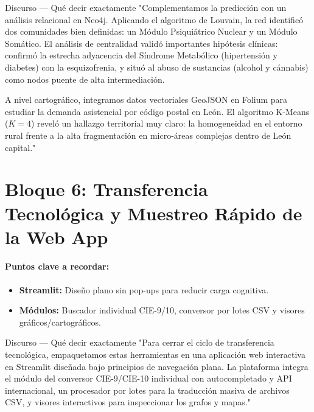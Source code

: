 \documentclass[11pt, a4paper]{article}
\newcommand{\timebadge}[2]{%
  \tcbox[
    on line,
    colback=timeBadge,
    colframe=speechBorder,
    arc=2mm,
    boxrule=0.5pt,
    top=1mm, bottom=1mm, left=2mm, right=2mm
  ]{\small \faClock\ \textbf{#1} \quad \textcolor{gray}{(#2)}}%
}
\begin{document}
\begin{speechbox}{Discurso — Qué decir exactamente}
"Complementamos la predicción con un análisis relacional en Neo4j. Aplicando el algoritmo de Louvain, la red identificó dos comunidades bien definidas: un Módulo Psiquiátrico Nuclear y un Módulo Somático. El análisis de centralidad validó importantes hipótesis clínicas: confirmó la estrecha adyacencia del Síndrome Metabólico (hipertensión y diabetes) con la esquizofrenia, y situó al abuso de sustancias (alcohol y cánnabis) como nodos puente de alta intermediación.

A nivel cartográfico, integramos datos vectoriales GeoJSON en Folium para estudiar la demanda asistencial por código postal en León. El algoritmo K-Means ($K=4$) reveló un hallazgo territorial muy claro: la homogeneidad en el entorno rural frente a la alta fragmentación en micro-áreas complejas dentro de León capital."
\end{speechbox}

\clearpage
\section{Bloque 6: Transferencia Tecnológica y Muestreo Rápido de la Web App}
\timebadge{0 min 30 s}{Minuto 8:30 - 9:00}

\paragraph{Puntos clave a recordar:}
\begin{itemize}[noitemsep]
    \item \textbf{Streamlit:} Diseño plano sin pop-ups para reducir carga cognitiva.
    \item \textbf{Módulos:} Buscador individual CIE-9/10, conversor por lotes CSV y visores gráficos/cartográficos.
\end{itemize}

\begin{speechbox}{Discurso — Qué decir exactamente}
"Para cerrar el ciclo de transferencia tecnológica, empaquetamos estas herramientas en una aplicación web interactiva en Streamlit diseñada bajo principios de navegación plana. La plataforma integra el módulo del conversor CIE-9/CIE-10 individual con autocompletado y API internacional, un procesador por lotes para la traducción masiva de archivos CSV, y visores interactivos para inspeccionar los grafos y mapas."
\end{speechbox}

\clearpage
\end{document}
